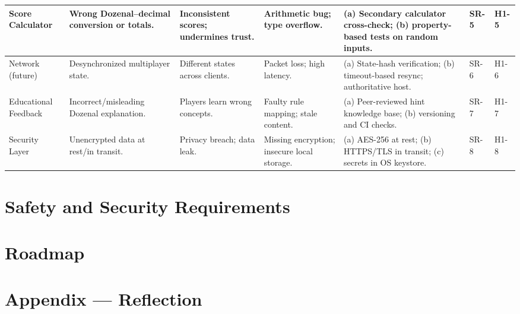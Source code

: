 \documentclass{article}
\begin{document}
\begin{small}
\begin{longtable}{@{}p{2.6cm} p{3.2cm} p{3.0cm} p{3.0cm} p{6.0cm} p{1.2cm} p{1.2cm}@{}}
            Score Calculator &
            Wrong Dozenal–decimal conversion or totals. &
            Inconsistent scores; undermines trust. &
            Arithmetic bug; type overflow. &
            (a) Secondary calculator cross-check; (b) property-based tests on random inputs. &
            SR-5 & H1-5 \\ \midrule

            Network (future) &
            Desynchronized multiplayer state. &
            Different states across clients. &
            Packet loss; high latency. &
            (a) State-hash verification; (b) timeout-based resync; authoritative host. &
            SR-6 & H1-6 \\ \midrule

            Educational Feedback &
            Incorrect/misleading Dozenal explanation. &
            Players learn wrong concepts. &
            Faulty rule mapping; stale content. &
            (a) Peer-reviewed hint knowledge base; (b) versioning and CI checks. &
            SR-7 & H1-7 \\ \midrule

            Security Layer &
            Unencrypted data at rest/in transit. &
            Privacy breach; data leak. &
            Missing encryption; insecure local storage. &
            (a) AES-256 at rest; (b) HTTPS/TLS in transit; (c) secrets in OS keystore. &
            SR-8 & H1-8 \\
        \end{longtable}
    \end{small}

\section{Safety and Security Requirements}


\section{Roadmap}


\newpage{}

\section*{Appendix --- Reflection}
\end{document}
